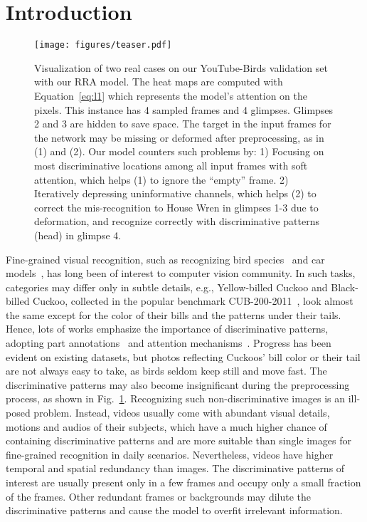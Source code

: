 \documentclass[runningheads]{llncs}
\begin{document}
\section{Introduction}
\begin{figure}[t]
\centering
\texttt{[image: figures/teaser.pdf]}
\caption{Visualization of two real cases on our YouTube-Birds validation set with our RRA model. The heat maps are computed with Equation~\ref{eq:l1} which represents the model's attention on the pixels. This instance has 4 sampled frames and 4 glimpses. Glimpses 2 and 3 are hidden to save space. 
The target in the input frames for the network may be missing or deformed after preprocessing, as in (1) and (2). Our model counters such problems by: 1) Focusing on most discriminative locations among all input frames with soft attention, which helps (1) to ignore the ``empty'' frame. 2) Iteratively depressing uninformative channels, which helps (2) to correct the mis-recognition to House Wren in glimpses 1-3 due to deformation, and recognize correctly with discriminative patterns (head) in glimpse 4. }
\label{fig:teaser}
\end{figure}
Fine-grained visual recognition, such as recognizing bird species~\cite{WahCUB_200_2011,Zheng_2017_ICCV} and car models~\cite{krause20133d,Gebru_2017_ICCV}, has long been of interest to computer vision community. In such tasks, categories may differ only in subtle details, e.g., Yellow-billed Cuckoo and Black-billed Cuckoo, collected in the popular benchmark CUB-200-2011~\cite{WahCUB_200_2011}, look almost the same except for the color of their bills and the patterns under their tails. Hence, lots of works emphasize the importance of discriminative patterns, adopting part annotations~\cite{zhang2016spda,zhang2014part} and attention mechanisms~\cite{Fu_2017_CVPR,Zheng_2017_ICCV}. Progress has been evident on existing datasets, but photos reflecting Cuckoos' bill color or their tail are not always easy to take, as birds seldom keep still and move fast. The discriminative patterns may also become insignificant during the preprocessing process, as shown in Fig.~\ref{fig:teaser}. Recognizing such non-discriminative images is an ill-posed problem.
Instead, videos usually come with abundant visual details, motions and audios of their subjects, which have a much higher chance of containing discriminative patterns and are more suitable than single images for fine-grained recognition in daily scenarios. Nevertheless, videos have higher temporal and spatial redundancy than images. The discriminative patterns of interest are usually present only in a few frames and occupy only a small fraction of the frames. Other redundant frames or backgrounds may dilute the discriminative patterns and cause the model to overfit irrelevant information. 
\end{document}
